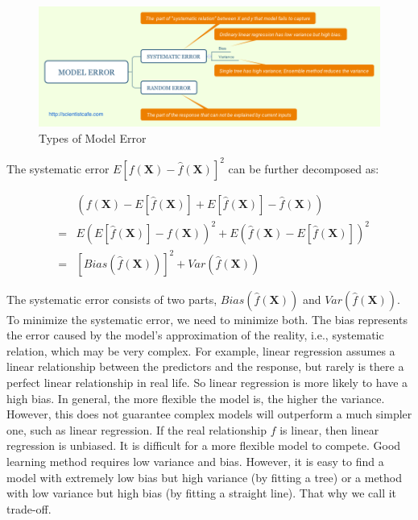 \documentclass[12pt,]{krantz}
\begin{document}
\begin{figure}
\centering
\includegraphics{images/ModelError.png}
\caption{Types of Model Error}
\end{figure}

The systematic error \(E[f(\mathbf{X})-\hat{f}(\mathbf{X})]^{2}\) can be further decomposed as:

\begin{equation}
\begin{array}{ccc}
 &  & \left(f(\mathbf{X})-E[\hat{f}(\mathbf{X})]+E[\hat{f}(\mathbf{X})]-\hat{f}(\mathbf{X})\right)\\
 & = & E\left(E[\hat{f}(\mathbf{X})]-f(\mathbf{X})\right)^{2}+E\left(\hat{f}(\mathbf{X})-E[\hat{f}(\mathbf{X})]\right)^{2}\\
 & = & [Bias(\hat{f}(\mathbf{X}))]^{2}+Var(\hat{f}(\mathbf{X}))
\end{array}
\label{eq:biasvariance}
\end{equation}

The systematic error consists of two parts, \(Bias(\hat{f}(\mathbf{X}))\) and \(Var (\hat{f}(\mathbf{X}))\). To minimize the systematic error, we need to minimize both. The bias represents the error caused by the model's approximation of the reality, i.e., systematic relation, which may be very complex. For example, linear regression assumes a linear relationship between the predictors and the response, but rarely is there a perfect linear relationship in real life. So linear regression is more likely to have a high bias. In general, the more flexible the model is, the higher the variance. However, this does not guarantee complex models will outperform a much simpler one, such as linear regression. If the real relationship \(f\) is linear, then linear regression is unbiased. It is difficult for a more flexible model to compete. Good learning method requires low variance and bias. However, it is easy to find a model with extremely low bias but high variance (by fitting a tree) or a method with low variance but high bias (by fitting a straight line). That why we call it trade-off.
\end{document}
